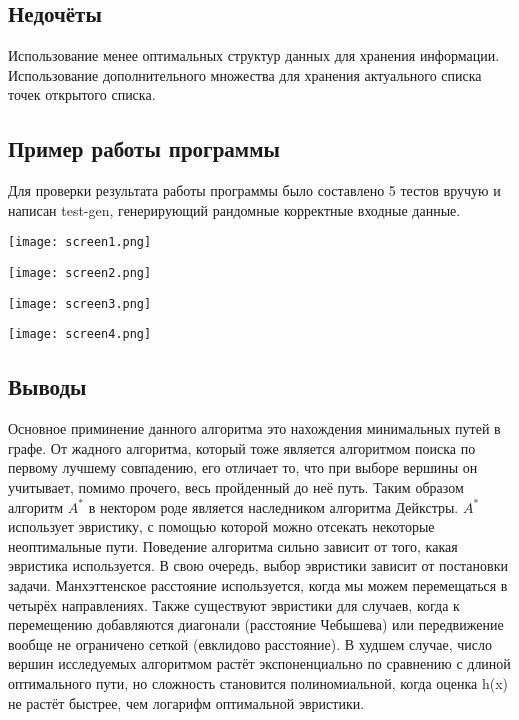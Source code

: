 \documentclass[12pt]{article}
\begin{document}
\subsection*{Недочёты}

Использование менее оптимальных структур данных для хранения информации.\\
Использование дополнительного множества для хранения актуального списка точек открытого списка.

\subsection*{Пример работы программы}

Для проверки результата работы программы было составлено 5 тестов вручую и написан test-gen, генерирующий рандомные корректные входные данные.

\texttt{[image: screen1.png]}

\texttt{[image: screen2.png]}

\texttt{[image: screen3.png]}

\texttt{[image: screen4.png]}

\subsection*{Выводы}

Основное приминение данного алгоритма это нахождения минимальных путей в графе. От жадного алгоритма, который тоже является алгоритмом поиска по первому лучшему совпадению, его отличает то, что при выборе вершины он учитывает, помимо прочего, весь пройденный до неё путь. Таким образом алгоритм $A^{*}$ в нектором роде является наследником алгоритма Дейкстры. $A^{*}$ использует эвристику, с помощью которой можно отсекать некоторые неоптимальные пути. Поведение алгоритма сильно зависит от того, какая эвристика используется. В свою очередь, выбор эвристики зависит от постановки задачи. Манхэттенское расстояние используется, когда мы можем перемещаться в четырёх направлениях. Также существуют эвристики для случаев, когда к перемещению добавляются диагонали (расстояние Чебышева) или передвижение вообще не ограничено сеткой (евклидово расстояние). В худшем случае, число вершин исследуемых алгоритмом растёт экспоненциально по сравнению с длиной оптимального пути, но сложность становится полиномиальной, когда оценка h(x) не растёт быстрее, чем логарифм оптимальной эвристики.
\\
\end{document}
